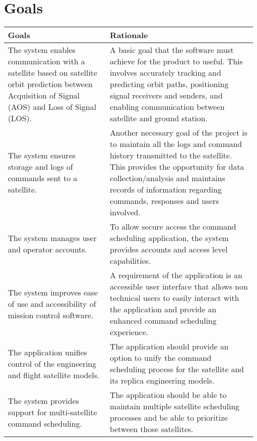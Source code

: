 \documentclass{article}
\begin{document}
\section{Goals}
\setlength{\arrayrulewidth}{0.5mm}
\setlength{\tabcolsep}{18pt}
\renewcommand{\arraystretch}{1.5}
\begin{tabular}{ | m{4cm} | m{8cm} | } 
\hline
  \textbf{Goals} & \textbf{Rationale} \\ 
  \hline
  The system enables communication with a satellite based on satellite orbit prediction between Acquisition of Signal (AOS) and Loss of Signal (LOS). & A basic goal that the software must achieve for the product to useful. This involves accurately tracking and predicting orbit paths, positioning signal receivers and senders, and enabling communication between satellite and ground station. \\ 
  \hline
  The system ensures storage and logs of commands sent to a satellite. & Another necessary goal of the project is to maintain all the logs and command history transmitted to the satellite. This provides the opportunity for data collection/analysis and maintains records of information regarding commands, responses and users involved. \\ 
  \hline
  The system manages user and operator accounts. & To allow secure access the command scheduling application, the system provides accounts and access level capabilities.  \\ 
  \hline
  The system improves ease of use and accessibility of mission control software. & A requirement of the application is an accessible user interface that allows non technical users to easily interact with the application and provide an enhanced command scheduling experience. \\
  \hline
  The application unifies control of the engineering and flight satellite models. &  The application should provide an option to unify the command scheduling process for the satellite and its replica engineering models.\\
  \hline
  The system provides support for multi-satellite command scheduling. & The application should be able to maintain multiple satellite scheduling processes and be able to prioritize between those satellites. \\
  \hline
  

\end{tabular}
\end{document}

